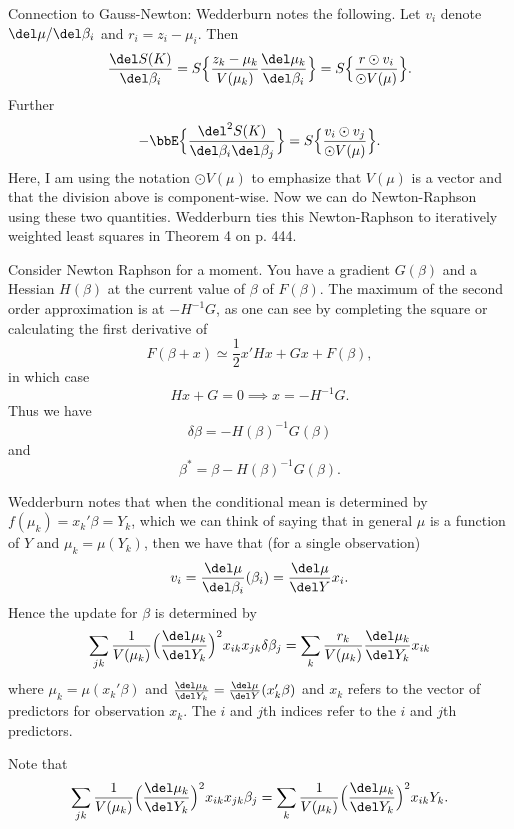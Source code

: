 \documentclass{article}
\newcommand{\graddel}[2]{\frac{\del #1}{\del #2}}
\newcommand{\hessdel}[3]{\frac{\del^2 #1}{\del #2 \del #3}}
\begin{document}
Connection to Gauss-Newton: Wedderburn notes the following.  Let $v_i$ denote
$\del \mu / \del \beta_i$ and $r_i = z_i - \mu_i$.  Then
\[
\graddel{S(K)}{\beta_i} = S \Big\{ \frac{z_k - \mu_k}{V(\mu_k)} \frac{\del
  \mu_k}{ \del \beta_i} \Big\} = S \Big\{ \frac{r \odot v_i}{\odot V(\mu)} \Big\}.
\]
Further
\[
- \bbE \Big\{ \hessdel{S(K)}{\beta_i}{\beta_j} \Big\} = S \Big\{ \frac{v_i
  \odot v_j}{\odot V(\mu)} \Big\}.
\]
Here, I am using the notation $\odot V(\mu)$ to emphasize that $V(\mu)$ is a
vector and that the division above is component-wise.  Now we can do
Newton-Raphson using these two quantities.  Wedderburn ties this Newton-Raphson
to iteratively weighted least squares in Theorem 4 on p. 444.

Consider Newton Raphson for a moment.  You have a gradient $G(\beta)$ and a
Hessian $H(\beta)$ at the current value of $\beta$ of $F(\beta)$.  The maximum
of the second order approximation is at $-H^{-1} G$, as one can see by
completing the square or calculating the first derivative of
\[
F(\beta + x) \simeq \frac{1}{2} x' H x + G x + F(\beta),
\]
in which case
\[
Hx + G = 0 \implies x = - H^{-1} G.
\]
Thus we have
\[
\delta \beta = - H(\beta)^{-1} G(\beta)
\]
and
\[
\beta^* = \beta - H(\beta)^{-1} G(\beta).
\]

Wedderburn notes that when the conditional mean is determined by $f(\mu_k) =
x_k' \beta = Y_k$, which we can think of saying that in general $\mu$ is a
function of $Y$ and $\mu_k = \mu(Y_k)$, then we have that (for a single
observation)
\[
v_i = \graddel{\mu}{\beta_i}(\beta_i) = \graddel{\mu}{Y} x_i .
\]
Hence the update for $\beta$ is determined by
\[
\sum_{jk} \frac{1}{V(\mu_k)} \Big(\graddel{\mu_k}{Y_k}\Big)^2 x_{ik} x_{jk} \delta
\beta_j
= \sum_{k} \frac{r_k}{V(\mu_k)}\graddel{\mu_k}{Y_k} x_{ik}
\]
where $\mu_k = \mu(x_k' \beta)$ and $\graddel{\mu_k}{Y_k} =
\graddel{\mu}{Y}(x_k' \beta)$ and $x_k$ refers to the vector of predictors for
observation $x_k$.  The $i$ and $j$th indices refer to the $i$ and $j$th
predictors.

Note that 
\[
\sum_{jk} \frac{1}{V(\mu_k)} \Big(\graddel{\mu_k}{Y_k}\Big)^2 x_{ik} x_{jk}
\beta_j = 
\sum_{k} \frac{1}{V(\mu_k)} \Big(\graddel{\mu_k}{Y_k}\Big)^2 x_{ik} Y_k.
\]
\end{document}
